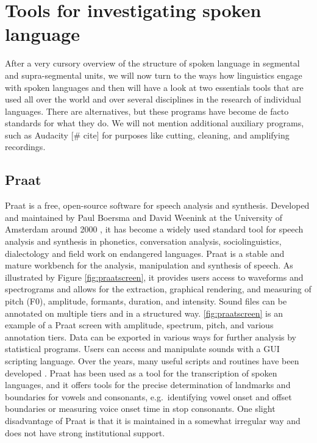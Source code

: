 \section{Tools for investigating spoken language}

After a very cursory overview of the structure of spoken language in segmental and supra-segmental units, we will now turn to the ways how linguistics engage with spoken languages and then will have a look at two essentials tools that are used all over the world and over several disciplines in the research of individual languages. There are alternatives, but these programs have become de facto standards for what they do. We will not mention additional auxiliary programs, such as Audacity [# cite] for purposes like cutting, cleaning, and amplifying recordings.


\subsection{Praat}

Praat is a free, open-source software for speech analysis and synthesis. Developed and maintained by Paul Boersma and David Weenink at the University of Amsterdam around 2000 \cite{boersma2001praat}, it has become a widely used standard tool for speech analysis and synthesis in phonetics, conversation analysis, sociolinguistics, dialectology and field work on endangered languages. Praat is a stable and mature workbench for the analysis, manipulation and synthesis of speech. As illustrated by Figure \ref{fig:praatscreen}, it provides users access to waveforms and spectrograms and allows for the extraction, graphical rendering, and measuring of pitch (F0), amplitude, formants, duration, and intensity. Sound files can be annotated on multiple tiers and in a structured way. \ref{fig:praatscreen} is an example of a Praat screen with amplitude, spectrum, pitch, and various annotation tiers. Data can be exported in various ways for further analysis by statistical programs. Users can access and manipulate sounds with a GUI scripting language. Over the years, many useful scripts and routines have been developed \cite{Styler2022}. Praat has been used as a tool for the transcription of spoken languages, and it offers tools for the precise determination of landmarks and boundaries for vowels and consonants, e.g.\ identifying vowel onset and offset boundaries or measuring voice onset time in stop consonants. One slight disadvantage of Praat is that it is maintained in a somewhat irregular way and does not have strong institutional support.



